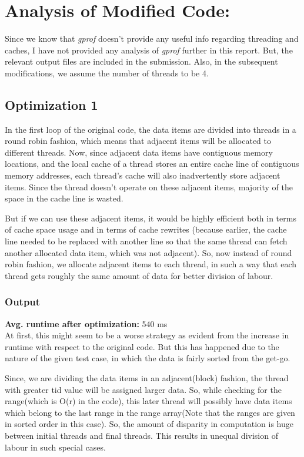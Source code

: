 \documentclass{article}
\begin{document}
    \section{Analysis of Modified Code:}
    Since we know that \textit{gprof} doesn't provide any useful info regarding threading and caches, I have not provided any analysis of \textit{gprof} further in this report. But, the relevant output files are included in the submission.  Also, in the subsequent modifications, we assume the number of threads to be 4.

    \subsection{Optimization 1}
    In the first loop of the original code, the data items are divided into threads in a round robin fashion, which means that adjacent items will be allocated to different threads. Now, since adjacent data items have contiguous memory locations, and the local cache of a thread stores an entire cache line of contiguous memory addresses, each thread's cache will also inadvertently store adjacent items. Since the thread doesn't operate on these adjacent items, majority of the space in the cache line is wasted. 
    
    But if we can use these adjacent items, it would be highly efficient both in terms of cache space usage and in terms of cache rewrites (because earlier, the cache line needed to be replaced with another line so that the same thread can fetch another allocated data item, which was not adjacent). So, now instead of round robin fashion, we allocate adjacent items to each thread, in such a way that each thread gets roughly the same amount of data for better division of labour. 
    
    \subsubsection{Output}
    \noindent
    \textbf{Avg. runtime after optimization:} 540 ms \\
    
    At first, this might seem to be a worse strategy as evident from the increase in runtime with respect to the original code. But this has happened due to the nature of the given test case, in which the data is fairly sorted from the get-go. 
    
    Since, we are dividing the data items in an adjacent(block) fashion, the thread with greater tid value will be assigned larger data. So, while checking for the range(which is O(r) in the code), this later thread will possibly have data items which belong to the last range in the range array(Note that the ranges are given in sorted order in this case). So, the amount of disparity in computation is huge between initial threads and final threads. This results in unequal division of labour in such special cases. 
    
\end{document}
